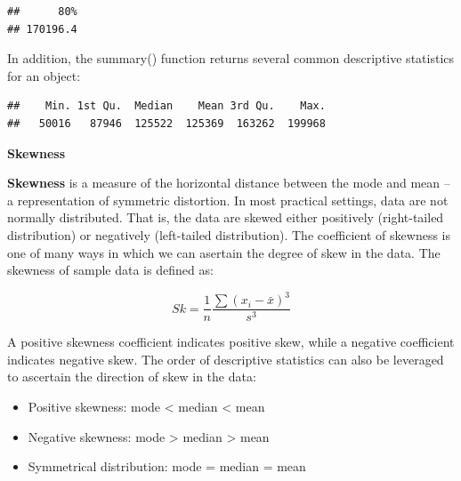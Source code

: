 \documentclass[]{book}
\newenvironment{Shaded}{\begin{snugshade}}{\end{snugshade}}
\newcommand{\CommentTok}[1]{\textcolor[rgb]{0.56,0.35,0.01}{\textit{#1}}}
\newcommand{\DataTypeTok}[1]{\textcolor[rgb]{0.13,0.29,0.53}{#1}}
\newcommand{\FloatTok}[1]{\textcolor[rgb]{0.00,0.00,0.81}{#1}}
\newcommand{\KeywordTok}[1]{\textcolor[rgb]{0.13,0.29,0.53}{\textbf{#1}}}
\newcommand{\NormalTok}[1]{#1}
\newcommand{\OperatorTok}[1]{\textcolor[rgb]{0.81,0.36,0.00}{\textbf{#1}}}
\providecommand{\tightlist}{%
  \setlength{\itemsep}{0pt}\setlength{\parskip}{0pt}}
\begin{document}
\begin{Shaded}
\end{Shaded}

\begin{verbatim}
##      80% 
## 170196.4
\end{verbatim}

In addition, the summary() function returns several common descriptive statistics for an object:

\begin{Shaded}
\end{Shaded}

\begin{verbatim}
##    Min. 1st Qu.  Median    Mean 3rd Qu.    Max. 
##   50016   87946  125522  125369  163262  199968
\end{verbatim}

\textbf{Skewness}

\textbf{Skewness} is a measure of the horizontal distance between the mode and mean -- a representation of symmetric distortion. In most practical settings, data are not normally distributed. That is, the data are skewed either positively (right-tailed distribution) or negatively (left-tailed distribution). The coefficient of skewness is one of many ways in which we can asertain the degree of skew in the data. The skewness of sample data is defined as:

\[ Sk = \frac{1}{n} \frac{\sum(x_i-\bar{x})^3}{s^3} \]

A positive skewness coefficient indicates positive skew, while a negative coefficient indicates negative skew. The order of descriptive statistics can also be leveraged to ascertain the direction of skew in the data:

\begin{itemize}
\tightlist
\item
  Positive skewness: mode \textless{} median \textless{} mean
\item
  Negative skewness: mode \textgreater{} median \textgreater{} mean
\item
  Symmetrical distribution: mode = median = mean
\end{itemize}
\end{document}
